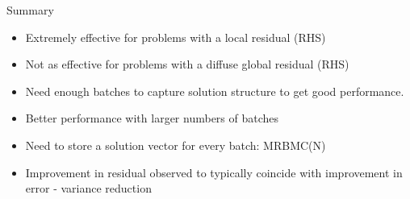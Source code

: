 \documentclass{beamer}
\begin{document}
\begin{frame}{Summary}

  \begin{itemize}
  \item Extremely effective for problems with a local residual (RHS)
  \item Not as effective for problems with a diffuse global residual (RHS)
  \item Need enough batches to capture solution structure to get good
    performance.
  \item Better performance with larger numbers of batches
  \item Need to store a solution vector for every batch: MRBMC(N)
  \item Improvement in residual observed to typically coincide with
    improvement in error - variance reduction
  \end{itemize}

\end{frame}

\end{document}
